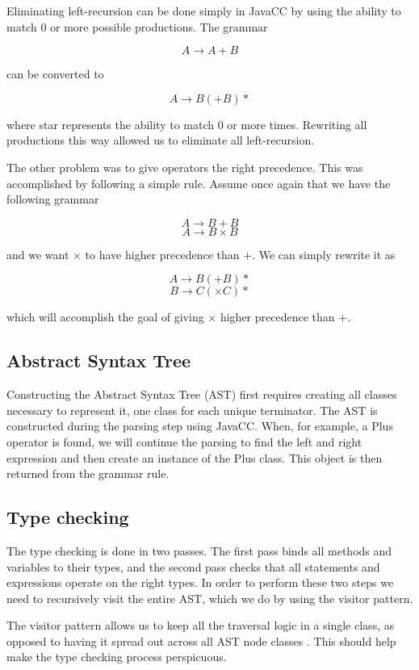 \documentclass[a4paper]{article}
\begin{document}
Eliminating left-recursion can be done simply in JavaCC by using the
ability to match $0$ or more possible productions. The grammar

$$A \rightarrow A + B$$

can be converted to

$$A \rightarrow B (+ B)*$$

where star represents the ability to match $0$ or more times. Rewriting all
productions this way allowed us to eliminate all left-recursion.

The other problem was to give operators the right precedence. This was
accomplished by following a simple rule. Assume once again that we have the
following grammar

$$A \rightarrow B + B$$
$$A \rightarrow B \times B$$

and we want $\times$ to have higher precedence than $+$. We can simply rewrite it as

$$A \rightarrow B (+ B)*$$
$$B \rightarrow C (\times C)*$$

which will accomplish the goal of giving $\times$ higher precedence than $+$.

\subsection{Abstract Syntax Tree}

Constructing the Abstract Syntax Tree (AST) first requires creating all classes
necessary to represent it, one class for each unique terminator. The AST is
constructed during the parsing step using JavaCC. When, for example, a Plus
operator is found, we will continue the parsing to find the left and right
expression and then create an instance of the Plus class. This object is then
returned from the grammar rule.

\subsection{Type checking}

The type checking is done in two passes. The first pass binds all methods and
variables to their types, and the second pass checks that all statements and
expressions operate on the right types. In order to perform these two steps we
need to recursively visit the entire AST, which we do by using the visitor
pattern.

The visitor pattern allows us to keep all the traversal logic in a single class,
as opposed to having it spread out across all AST node classes
\cite{oodesignvisitor}. This should help make the type checking process
perspicuous.
\end{document}
